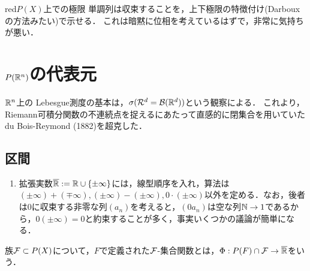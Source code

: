 \documentclass[uplatex, dvipdfmx]{jsreport}
\begin{document}
\begin{tbox}{red}{$P(X)$上での極限}
    単調列は収束することを，上下極限の特徴付け(Darbouxの方法みたい)で示せる．
    これは暗黙に位相を考えているはずで，非常に気持ちが悪い．
\end{tbox}

\section{$P(\mathbb{R}^n)$の代表元}

\begin{tcolorbox}[colframe=ForestGreen, colback=ForestGreen!10!white,breakable,colbacktitle=ForestGreen!40!white,coltitle=black,fonttitle=\bfseries\sffamily,
title=]
    $\mathbb{R}^n$上の
    Lebesgue測度の基本は，$\sigma(\mathcal{R}^d=\mathcal{B}(\mathbb{R}^d))$という観察による．
    これより，Riemann可積分関数の不連続点を捉えるにあたって直感的に閉集合を用いていたdu Bois-Reymond (1882)を超克した．
\end{tcolorbox}

\subsection{区間}

\begin{definition}\mbox{}
    \begin{enumerate}
        \item 拡張実数$\overline{\mathbb{R}}:=\mathbb{R}\cup\{\pm\infty\}$には，線型順序を入れ，算法は$(\pm\infty)+(\mp\infty),(\pm\infty)-(\pm\infty),0\cdot(\pm\infty)$以外を定める．なお，後者は$0$に収束する非零な列$(a_n)$を考えると，$(0a_n)$は空な列$\mathbb{N}\to 1$であるから，$0(\pm\infty)=0$と約束することが多く，事実いくつかの議論が簡単になる．
    \end{enumerate}
    族$\mathcal{F}\subset P(X)$について，$F$で定義された$\mathcal{F}$-集合関数とは，$\Phi:P(F)\cap\mathcal{F}\to\overline{\mathbb{R}}$をいう．
\end{definition}
\end{document}
